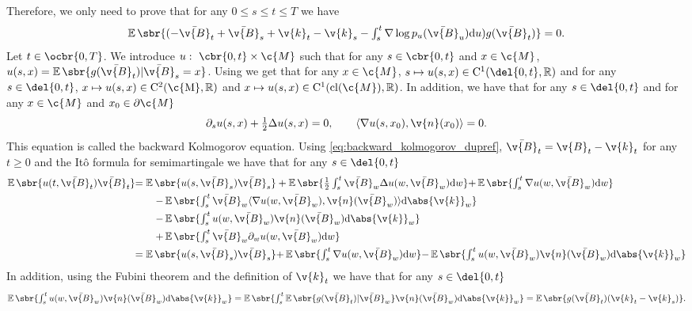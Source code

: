 Therefore, we only need to prove that for any $0 \leq s \leq t \leq T$ we have \begin{equation} \label{eq:second_equality} \textstyle{\E\sbr{(-\bar{\v{B}}_{t} + \bar{\v{B}}_{s} + \v{k}_t - \v{k}_{s} - \int_{s}^{t} \nabla \log p_u(\bar{\v{B}}_u) \mathrm{d} u) g(\bar{\v{B}}_{t})}=0 .
	}
\end{equation}
Let $t \in \ocbr{0,T}$.
We introduce $u: \ \cbr{0,t} \times \c{M}$ such that for any $s \in \cbr{0,t}$ and $x \in \c{M}$, $u(s, x) = \E\sbr{g(\bar{\v{B}}_t) \vert \bar{\v{B}}_s=x}$.
Using \textcite[Theorem 2.8]{burdzy2004heat} we get that for any $x \in \c{M}$, $s \mapsto u(s,x) \in \mathrm{C}^1(\del{0,t}, \R)$ and for any $s \in \del{0,t}$, $x \mapsto u(s,x) \in \mathrm{C}^2(\mathrm{\c{M}}, \R)$ and $x \mapsto u(s,x) \in \mathrm{C}^1(\mathrm{cl}(\c{M}), \R)$.
In addition, we have that for any $s \in \del{0,t}$ and for any $x \in \c{M}$ and $x_0 \in \partial \c{M}$ \begin{equation} \label{eq:backward_kolmogorov_dupref} \textstyle{\partial_s u(s,x) + \tfrac{1}{2} \Delta u(s,x) = 0 , \qquad \langle \nabla u(s, x_0), \v{n}(x_0) \rangle = 0 .
	}
\end{equation}
This equation is called the backward Kolmogorov equation.
Using \eqref{eq:backward_kolmogorov_dupref}, $\bar{\v{B}}_t = \v{B}_t - \v{k}_t$ for any $t \geq 0$ and the It\^o formula for semimartingale \parencite[Chapter IV, Theorem 3.3]{revuz2013continuous} we have that for any $s \in \del{0,t}$ \begin{align} \E\sbr{u(t, \bar{\v{B}}_t)\bar{\v{B}}_t} & \textstyle{= \E\sbr{u(s, \bar{\v{B}}_s)\bar{\v{B}}_s} + \E\sbr{\tfrac{1}{2} \int_s^t \bar{\v{B}}_w \Delta u(w, \bar{\v{B}}_w) \mathrm{d} w}} \textstyle{+\E\sbr{\int_s^t \nabla u(w, \bar{\v{B}}_w) \mathrm{d} w }} \\ & \qquad \textstyle{- \E\sbr{\int_s^t \bar{\v{B}}_w \langle \nabla u(w, \bar{\v{B}}_w), \v{n}(\bar{\v{B}}_w) \rangle \mathrm{d} \abs{\v{k}}_w}} \\ & \qquad \textstyle{- \E\sbr{\int_s^t u(w,\bar{\v{B}}_w) \v{n}(\bar{\v{B}}_w) \mathrm{d} \abs{\v{k}}_w}} \\ & \qquad \textstyle{+ \E\sbr{\int_s^t \bar{\v{B}}_w \partial_w u(w, \bar{\v{B}}_w) \mathrm{d} w} } \\ & \textstyle{= \E\sbr{u(s, \bar{\v{B}}_s)\bar{\v{B}}_s} \textstyle{+\E\sbr{\int_s^t \nabla u(w, \bar{\v{B}}_w) \mathrm{d} w }}} \textstyle{- \E\sbr{\int_s^t u(w,\bar{\v{B}}_w) \v{n}(\bar{\v{B}}_w) \mathrm{d} \abs{\v{k}}_w}} \label{eq:intermediate} \end{align} In addition, using the Fubini theorem and the definition of $\v{k}_t$ we have that for any $s \in \del{0,t}$ \begin{equation} \textstyle{\E\sbr{\int_s^t u(w,\bar{\v{B}}_w) \v{n}(\bar{\v{B}}_w) \mathrm{d} \abs{\v{k}}_w} = \E\sbr{\int_s^t \E\sbr{g(\bar{\v{B}}_t) \vert \bar{\v{B}}_w} \v{n}(\bar{\v{B}}_w) \mathrm{d} \abs{\v{k}}_w} = \E\sbr{g(\bar{\v{B}}_t)(\v{k}_t - \v{k}_s)} .
	} \label{eq:boundary_uno}
\end{equation}
